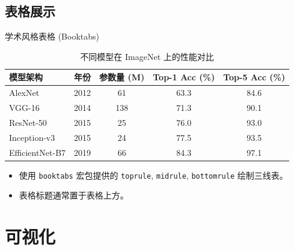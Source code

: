 \subsection{表格展示}
\begin{frame}{学术风格表格 (Booktabs)}
  \begin{table}
    \caption{不同模型在 ImageNet 上的性能对比}
    \centering
    \small
    \begin{tabularx}{\textwidth}{Xcccc}
      \toprule
      \textbf{模型架构} & \textbf{年份} & \textbf{参数量 (M)} & \textbf{Top-1
      Acc (\%)} & \textbf{Top-5 Acc (\%)} \\
      \midrule
      AlexNet         & 2012 & 61    & 63.3 & 84.6 \\
      VGG-16          & 2014 & 138   & 71.3 & 90.1 \\
      ResNet-50       & 2015 & 25    & 76.0 & 93.0 \\
      Inception-v3    & 2015 & 24    & 77.5 & 93.5 \\
      EfficientNet-B7 & 2019 & 66    & 84.3 & 97.1 \\
      \bottomrule
    \end{tabularx}
  \end{table}
  \vspace{0.5em}
  \begin{itemize}
    \item 使用 \texttt{booktabs} 宏包提供的 \texttt{toprule},
      \texttt{midrule}, \texttt{bottomrule} 绘制三线表。
    \item 表格标题通常置于表格上方。
  \end{itemize}
\end{frame}

\section{可视化}

